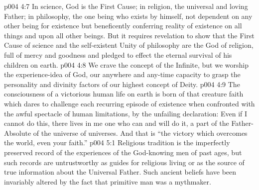\vs p004 4:7 \pc In science, God is the First Cause; in religion, the universal and loving Father; in philosophy, the one being who exists by himself, not dependent on any other being for existence but beneficently conferring reality of existence on all things and upon all other beings. But it requires revelation to show that the First Cause of science and the self\hyp{}existent Unity of philosophy are the God of religion, full of mercy and goodness and pledged to effect the eternal survival of his children on earth.
\vs p004 4:8 We crave the concept of the Infinite, but we worship the experience\hyp{}idea of God, our anywhere and any\hyp{}time capacity to grasp the personality and divinity factors of our highest concept of Deity.
\vs p004 4:9 The consciousness of a victorious human life on earth is born of that creature faith which dares to challenge each recurring episode of existence when confronted with the awful spectacle of human limitations, by the unfailing declaration: Even if I cannot do this, there lives in me one who can and will do it, a part of the Father\hyp{}Absolute of the universe of universes. And that is “the victory which overcomes the world, even your faith.”
\vs p004 5:1 Religious tradition is the imperfectly preserved record of the experiences of the God\hyp{}knowing men of past ages, but such records are untrustworthy as guides for religious living or as the source of true information about the Universal Father. Such ancient beliefs have been invariably altered by the fact that primitive man was a mythmaker.
